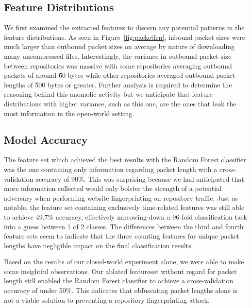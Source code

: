 \documentclass[sigconf,authorversion,nonacm]{acmart}
\begin{document}
\subsection{Feature Distributions}
We first examined the extracted features to discern any potential patterns in the feature distributions. As seen in Figure~\ref{fig:packetlen}, inbound packet sizes were much larger than outbound packet sizes on average by nature of downloading many uncompressed files. Interestingly, the variance in outbound packet size between repositories was massive with some repositories averaging outbound packets of around \~60 bytes while other repositories averaged outbound packet lengths of \~500 bytes or greater. Further analysis is required to determine the reasoning behind this anomolic activity but we anticipate that feature distributions with higher variance, such as this one, are the ones that leak the most information in the open-world setting.

\subsection{Model Accuracy}
The feature set which achieved the best results with the Random Forest classifier was the one containing only information regarding packet length with a cross-validation accuracy of 90\%.  This was surprising because we had anticipated that more information collected would only bolster the strength of a potential adversary when performing website fingerprinting on repository traffic. Just as notable, the feature set containing exclusively time-related features was still able to achieve 49.7\% accuracy, effectively narrowing down a 96-fold classification task into a guess between 1 of 2 classes. The differences between the third and fourth feature sets seem to indicate that the three counting features for unique packet lengths have negligible impact on the final classification results.

Based on the results of our closed-world experiment alone, we were able to make some insightful observations. Our ablated featureset without regard for packet length still enabled the Random Forest classifier to achieve a cross-validation accuracy of under 50\%. This indicates that obfuscating packet lengths alone is not a viable solution to preventing a repository fingerprinting attack.
\end{document}

